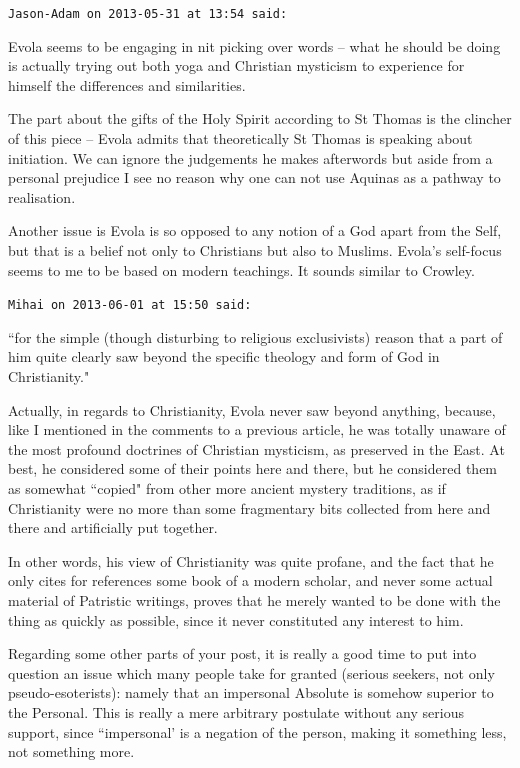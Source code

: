 \begin{footnotesize}
\begin{sffamily}
\hfill

\texttt{Jason-Adam on 2013-05-31 at 13:54 said: }

Evola seems to be engaging in nit picking over words – what he should be doing is actually trying out both yoga and Christian mysticism to experience for himself the differences and similarities.

The part about the gifts of the Holy Spirit according to St Thomas is the clincher of this piece – Evola admits that theoretically St Thomas is speaking about initiation. We can ignore the judgements he makes afterwords but aside from a personal prejudice I see no reason why one can not use Aquinas as a pathway to realisation. 

Another issue is Evola is so opposed to any notion of a God apart from the Self, but that is a belief not only to Christians but also to Muslims. Evola's self-focus seems to me to be based on modern teachings. It sounds similar to Crowley.


\hfill

\texttt{Mihai on 2013-06-01 at 15:50 said: }

``for the simple (though disturbing to religious exclusivists) reason that a part of him quite clearly saw beyond the specific theology and form of God in Christianity."

Actually, in regards to Christianity, Evola never saw beyond anything, because, like I mentioned in the comments to a previous article, he was totally unaware of the most profound doctrines of Christian mysticism, as preserved in the East. At best, he considered some of their points here and there, but he considered them as somewhat ``copied" from other more ancient mystery traditions, as if Christianity were no more than some fragmentary bits collected from here and there and artificially put together.

In other words, his view of Christianity was quite profane, and the fact that he only cites for references some book of a modern scholar, and never some actual material of Patristic writings, proves that he merely wanted to be done with the thing as quickly as possible, since it never constituted any interest to him.

Regarding some other parts of your post, it is really a good time to put into question an issue which many people take for granted (serious seekers, not only pseudo-esoterists): namely that an impersonal Absolute is somehow superior to the Personal. This is really a mere arbitrary postulate without any serious support, since ``impersonal' is a negation of the person, making it something less, not something more. 


\end{sffamily}
\end{footnotesize}
